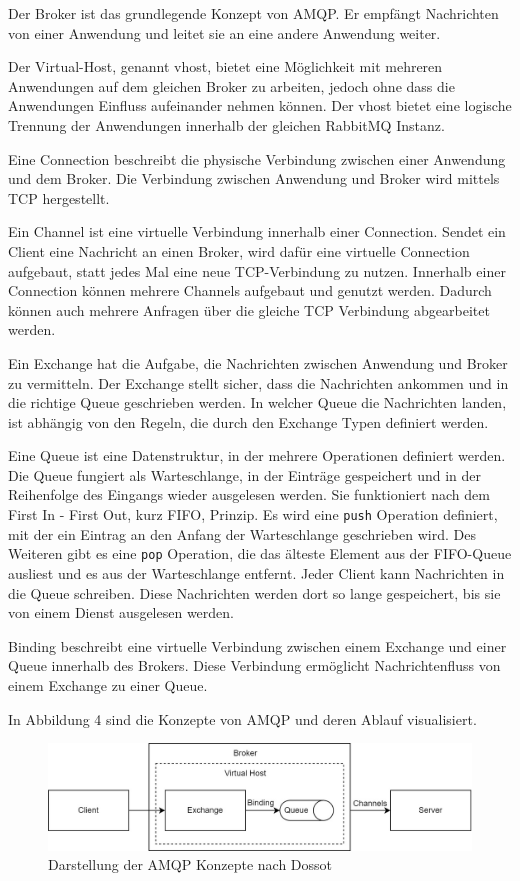Der Broker ist das grundlegende Konzept von AMQP. Er empfängt Nachrichten von einer Anwendung und leitet sie an eine andere Anwendung weiter.

Der Virtual-Host, genannt vhost, bietet eine Möglichkeit mit mehreren Anwendungen auf dem gleichen Broker zu arbeiten, jedoch ohne dass die Anwendungen Einfluss aufeinander nehmen können. Der vhost bietet eine logische Trennung der Anwendungen innerhalb der gleichen RabbitMQ Instanz.

Eine Connection beschreibt die physische Verbindung zwischen einer Anwendung und dem Broker. Die Verbindung zwischen Anwendung und Broker wird mittels TCP hergestellt. 

Ein Channel ist eine virtuelle Verbindung innerhalb einer Connection. Sendet ein Client eine Nachricht an einen Broker, wird dafür eine virtuelle Connection aufgebaut, statt jedes Mal eine neue TCP-Verbindung zu nutzen. Innerhalb einer Connection können mehrere Channels aufgebaut und genutzt werden. Dadurch können auch mehrere Anfragen über die gleiche TCP Verbindung abgearbeitet werden. 

Ein Exchange hat die Aufgabe, die Nachrichten zwischen Anwendung und Broker zu vermitteln. Der Exchange stellt sicher, dass die Nachrichten ankommen und in die richtige Queue geschrieben werden. In welcher Queue die Nachrichten landen, ist abhängig von den Regeln, die durch den Exchange Typen definiert werden.  

Eine Queue ist eine Datenstruktur, in der mehrere Operationen definiert werden. Die Queue fungiert als Warteschlange, in der Einträge gespeichert und in der Reihenfolge des Eingangs wieder ausgelesen werden. Sie funktioniert nach dem First In - First Out, kurz FIFO, Prinzip. Es wird eine \texttt{push} Operation definiert, mit der ein Eintrag an den Anfang der Warteschlange geschrieben wird. Des Weiteren gibt es eine \texttt{pop} Operation, die das älteste Element aus der FIFO-Queue ausliest und es aus der Warteschlange entfernt. Jeder Client kann Nachrichten in die Queue schreiben. Diese Nachrichten werden dort so lange gespeichert, bis sie von einem Dienst ausgelesen werden. 

Binding beschreibt eine virtuelle Verbindung zwischen einem Exchange und einer Queue innerhalb des Brokers. Diese Verbindung ermöglicht Nachrichtenfluss von einem Exchange zu einer Queue.

In Abbildung 4 sind die Konzepte von AMQP und deren Ablauf visualisiert.

\begin{figure}[H]
  \centering
    \includegraphics[width = 15cm]{bilder/Rabbit4}
    \caption{Darstellung der AMQP Konzepte nach Dossot}
\end{figure}

